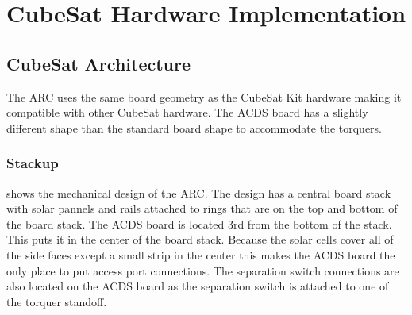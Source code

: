 
\chapter{CubeSat Hardware Implementation}

\label{ch:CubeSatHardware}

\section{CubeSat Architecture}


The \ac{ARC} uses the same board geometry as the CubeSat Kit\cite{CSK} hardware making it compatible with other CubeSat hardware. The \ac{ACDS} board has a slightly different shape than the standard board shape to accommodate the torquers.

\subsection{Stackup}

 shows the mechanical design of the \ac{ARC}. The design has a central board stack with solar pannels and rails attached to rings that are on the top and bottom of the board stack. The \ac{ACDS} board is located 3rd from the bottom of the stack. This puts it in the center of the board stack. Because the solar cells cover all of the side faces except a small strip in the center this makes the \ac{ACDS} board the only place to put access port connections. The separation switch connections are also located on the \ac{ACDS} board as the separation switch is attached to one of the torquer standoff.


